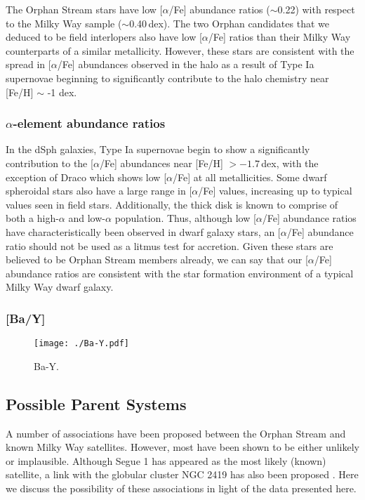 \documentclass{emulateapj}
\begin{document}
The Orphan Stream stars have low [$\alpha$/Fe] abundance ratios ($\sim$0.22) with respect to the Milky Way sample ($\sim$0.40\,dex). The two Orphan candidates that we deduced to be field interlopers also have low [$\alpha$/Fe] ratios than their Milky Way counterparts of a similar metallicity. However, these stars are consistent with the spread in [$\alpha$/Fe] abundances observed in the halo as a result of Type Ia supernovae beginning to significantly contribute to the halo chemistry near [Fe/H] $\sim$ -1 dex.

\subsubsection{$\alpha$-element abundance ratios}
In the dSph galaxies, Type Ia supernovae begin to show a significantly contribution to the [$\alpha$/Fe] abundances near [Fe/H] $> -1.7$\,dex,  with the exception of Draco which shows low [$\alpha$/Fe] at all metallicities. Some dwarf spheroidal stars also have a large range in [$\alpha$/Fe] values, increasing up to typical values seen in field stars. Additionally, the thick disk is known to comprise of both a high-$\alpha$ and low-$\alpha$ population. Thus, although low [$\alpha$/Fe] abundance ratios have characteristically been observed in dwarf galaxy stars, an [$\alpha$/Fe] abundance ratio should not be used as a litmus test for accretion. Given these stars are believed to be Orphan Stream members already, we can say that our [$\alpha$/Fe] abundance ratios are consistent with the star formation environment of a typical Milky Way dwarf galaxy. 


\subsubsection{[Ba/Y]}

\begin{figure}[h]
	\texttt{[image: ./Ba-Y.pdf]}
	\caption{Ba-Y.}
	\label{fig:ba-y}
\end{figure}


\subsection{Possible Parent Systems}
A number of associations have been proposed between the Orphan Stream and known Milky Way satellites. However, most have been shown to be either unlikely or implausible. Although Segue 1 has appeared as the most likely (known) satellite, a link with the globular cluster NGC 2419 has also been proposed \citet{bruens;et-al_2011}. Here we discuss the possibility of these associations in light of the data presented here.
\end{document}
